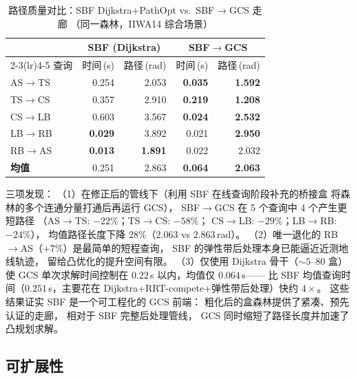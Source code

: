 \documentclass[journal]{IEEEtran}
\begin{document}
\begin{table}[ht]
\centering
\caption{路径质量对比：SBF Dijkstra+PathOpt vs.\ SBF$\to$GCS 走廊
  （同一森林，IIWA14 综合场景）}
\label{tab:gcs_corridor}
\begin{tabular}{@{}l rr rr@{}}
\toprule
 & \multicolumn{2}{c}{\textbf{SBF (Dijkstra)}}
 & \multicolumn{2}{c}{\textbf{SBF$\to$GCS}} \\
\cmidrule(lr){2-3}\cmidrule(lr){4-5}
查询 & 时间\,(s) & 路径\,(rad) & 时间\,(s) & 路径\,(rad) \\
\midrule
AS$\to$TS & 0.254 & 2.053 & \textbf{0.035} & \textbf{1.592} \\
TS$\to$CS & 0.357 & 2.910 & \textbf{0.219} & \textbf{1.208} \\
CS$\to$LB & 0.603 & 3.567 & \textbf{0.024} & \textbf{2.532} \\
LB$\to$RB & \textbf{0.029} & 3.892 & 0.021 & \textbf{2.950} \\
RB$\to$AS & \textbf{0.013} & \textbf{1.891} & 0.022 & 2.032 \\
\midrule
\textbf{均值} & 0.251 & 2.863 & \textbf{0.064} & \textbf{2.063} \\
\bottomrule
\end{tabular}
\end{table}

三项发现：
（1）在修正后的管线下（利用 SBF 在线查询阶段补充的桥接盒
将森林的多个连通分量打通后再运行 GCS），
SBF$\to$GCS 在 5 个查询中 4 个产生更短路径
（AS$\to$TS: $-22\%$；TS$\to$CS: $-58\%$；
CS$\to$LB: $-29\%$；LB$\to$RB: $-24\%$），
均值路径长度下降 $28\%$（$2.063$ vs $2.863$\,rad）。
（2）唯一退化的 RB$\to$AS（$+7\%$）是最简单的短程查询，
SBF 的弹性带后处理本身已能逼近近测地线轨迹，
留给凸优化的提升空间有限。
（3）仅使用 Dijkstra 骨干（${\sim}5$--80 盒）
使 GCS 单次求解时间控制在 $0.22$\,s 以内，均值仅 $0.064$\,s——
比 SBF 均值查询时间（$0.251$\,s，主要花在
Dijkstra+RRT-compete+弹性带后处理）快约 $4\times$。
这些结果证实 SBF 是一个可工程化的 GCS 前端：
粗化后的盒森林提供了紧凑、预先认证的走廊，
相对于 SBF 完整后处理管线，
GCS 同时缩短了路径长度并加速了凸规划求解。

\subsection{可扩展性}\label{sec:exp_scale}
\end{document}
